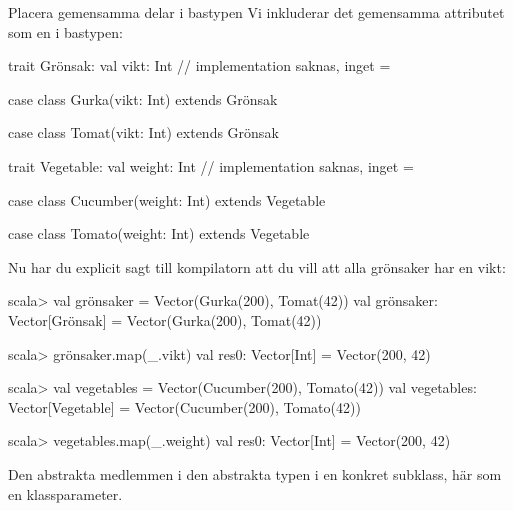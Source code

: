 \begin{Slide}{Placera gemensamma delar i bastypen}
\SlideFontSmall
Vi inkluderar det gemensamma attributet \ifswedish{}\else{}\fi{} som en  i bastypen:

\ifswedish
\begin{Code}
trait Grönsak:
  val vikt: Int    // implementation saknas, inget =

case class Gurka(vikt: Int) extends Grönsak

case class Tomat(vikt: Int) extends Grönsak
\end{Code}
\else
\begin{Code}
trait Vegetable:
  val weight: Int    // implementation saknas, inget =

case class Cucumber(weight: Int) extends Vegetable

case class Tomato(weight: Int) extends Vegetable
\end{Code}
\fi{}
Nu har du explicit sagt till kompilatorn att du vill att alla grönsaker har en vikt:
\ifswedish
\begin{REPLsmall}
scala> val grönsaker = Vector(Gurka(200), Tomat(42))
val grönsaker: Vector[Grönsak] = Vector(Gurka(200), Tomat(42))

scala> grönsaker.map(_.vikt)
val res0: Vector[Int] = Vector(200, 42)
\end{REPLsmall}
\else
\begin{REPLsmall}
scala> val vegetables = Vector(Cucumber(200), Tomato(42))
val vegetables: Vector[Vegetable] = Vector(Cucumber(200), Tomato(42))

scala> vegetables.map(_.weight)
val res0: Vector[Int] = Vector(200, 42)
\end{REPLsmall}
\fi{}
Den abstrakta medlemmen \ifswedish{}\else{}\fi{} i den abstrakta typen \ifswedish{}\else{}\fi{}  i en konkret subklass, här som en klassparameter.
\end{Slide}





